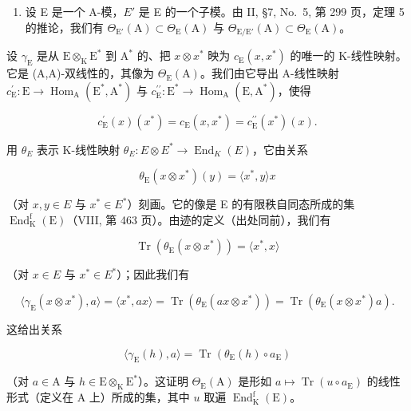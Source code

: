 \begin{enumerate}
\def\labelenumi{\arabic{enumi})}
\setcounter{enumi}{1}
\tightlist
\item
  设 E 是一个 A-模，\(E'\) 是 E 的一个子模。由 II, §7, No.~5, 第 299 页，定理 5 的推论，我们有 \(\Theta_{\mathrm{E}'}(\mathrm{A}) \subset \Theta_{\mathrm{E}}(\mathrm{A})\) 与 \(\Theta_{\mathrm{E}/\mathrm{E}'}(\mathrm{A}) \subset \Theta_{\mathrm{E}}(\mathrm{A})\)。
\end{enumerate}

设 \(\gamma_{\mathrm{E}}\) 是从 \(\mathrm{E} \otimes_{\mathrm{K}} \mathrm{E}^{*}\) 到 \(\mathrm{A}^{*}\) 的、把 \(x \otimes x^{*}\) 映为 \(c_{\mathrm{E}}(x, x^{*})\) 的唯一的 K-线性映射。它是 (A,A)-双线性的，其像为 \(\Theta_{\mathrm{E}}(\mathrm{A})\)。我们由它导出 A-线性映射 \(c_{\mathrm{E}}^{\prime}: \mathrm{E} \to \operatorname{Hom}_{\mathrm{A}}(\mathrm{E}^{*}, \mathrm{A}^{*})\) 与 \(c_{\mathrm{E}}^{\prime \prime}: \mathrm{E}^{*} \to \operatorname{Hom}_{\mathrm{A}}(\mathrm{E}, \mathrm{A}^{*})\)，使得

\[
c _ {\mathrm{E}} ^ {\prime} (x) (x ^ {*}) = c _ {\mathrm{E}} (x, x ^ {*}) = c _ {\mathrm{E}} ^ {\prime \prime} (x ^ {*}) (x).
\]

用 \(\theta_{E}\) 表示 K-线性映射 \(\theta_{E}: E \otimes E^{*} \to \operatorname{End}_{K}(E)\)，它由关系

\[
\theta_ {\mathrm{E}} (x \otimes x ^ {*}) (y) = \langle x ^ {*}, y \rangle x
\]

（对 \(x, y \in E\) 与 \(x^{*} \in E^{*}\)）刻画。它的像是 E 的有限秩自同态所成的集 \(\operatorname{End}_{\mathrm{K}}^{\mathrm{f}}(\mathrm{E})\)（VIII, 第 463 页）。由迹的定义（出处同前），我们有

\[
\operatorname{Tr} \left(\theta_ {\mathrm{E}} \left(x \otimes x ^ {*}\right)\right) = \langle x ^ {*}, x \rangle
\]

（对 \(x \in E\) 与 \(x^{*} \in E^{*}\)）；因此我们有

\[
\langle \gamma_ {\mathrm{E}} (x \otimes x ^ {*}), a \rangle = \langle x ^ {*}, a x \rangle = \operatorname{Tr} (\theta_ {\mathrm{E}} (a x \otimes x ^ {*})) = \operatorname{Tr} (\theta_ {\mathrm{E}} (x \otimes x ^ {*}) a).
\]

这给出关系

\[
\langle \gamma_ {\mathrm{E}} (h), a \rangle = \operatorname{Tr} (\theta_ {\mathrm{E}} (h) \circ a _ {\mathrm{E}})
\]

（对 \(a \in \mathrm{A}\) 与 \(h \in \mathrm{E} \otimes_{\mathrm{K}} \mathrm{E}^*\)）。这证明 \(\Theta_{\mathrm{E}}(\mathrm{A})\) 是形如 \(a \mapsto \operatorname{Tr}(u \circ a_{\mathrm{E}})\) 的线性形式（定义在 \(\mathrm{A}\) 上）所成的集，其中 \(u\) 取遍 \(\operatorname{End}_{\mathrm{K}}^{\mathrm{f}}(\mathrm{E})\)。

